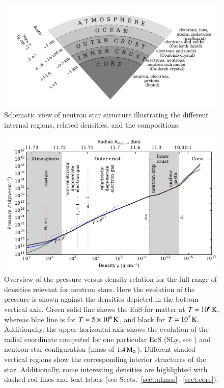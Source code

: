 \begin{figure}[t!]
\centering
\includegraphics[width=13.5cm]{figs/slice/atmos.pdf}
\caption{\label{fig:pizza}
Schematic view of neutron star structure illustrating the different internal regions, related densities, and the compositions.
}
\end{figure}


\begin{figure}[t!]
\centering
\includegraphics[width=12.5cm]{figs/eos/eos.pdf}
\caption{\label{fig:eos}
Overview of the pressure versus density relation for the full range of densities relevant for neutron stars.
Here the evolution of the pressure is shown against the densities depicted in the bottom vertical axis.
Green solid line shows the EoS for matter at $T=10^6\, \mathrm{K}$, whereas blue line is for $T=5 \times 10^{6}\, \mathrm{K}$, and black for $T=10^7 \, \mathrm{K}$.
Additionally, the upper horizontal axis shows the evolution of the radial coordinate computed for one particular EoS (SLy, see ) and neutron star configuration (mass of $1.4\, \mathrm{M}_{\odot}$).
Different shaded vertical regions show the corresponding interior structures of the star.
Additionally, some interesting densities are highlighted with dashed red lines and text labels (see Sects.~\ref{sect:atmos}$-$\ref{sect:core}). 
}
\end{figure}

